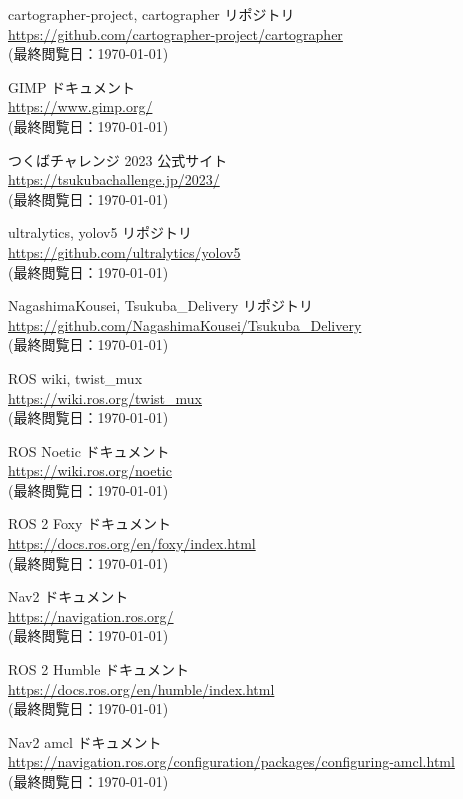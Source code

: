 \documentclass[twocolumn, 9pt]{jsproceedings}
\begin{document}
\begin{thebibliography}{99}
cartographer-project, cartographer リポジトリ\\
\url{https://github.com/cartographer-project/cartographer}\\
(最終閲覧日：\today)

GIMP ドキュメント\\
\url{https://www.gimp.org/}\\
(最終閲覧日：\today)

つくばチャレンジ 2023 公式サイト\\
\url{https://tsukubachallenge.jp/2023/}\\
(最終閲覧日：\today)

ultralytics, yolov5 リポジトリ\\
\url{https://github.com/ultralytics/yolov5}\\
(最終閲覧日：\today)

NagashimaKousei, Tsukuba\_Delivery リポジトリ\\
\url{https://github.com/NagashimaKousei/Tsukuba_Delivery}\\
(最終閲覧日：\today)

ROS wiki, twist\_mux\\
\url{https://wiki.ros.org/twist_mux}\\
(最終閲覧日：\today)

ROS Noetic ドキュメント\\
\url{https://wiki.ros.org/noetic}\\
(最終閲覧日：\today)

ROS 2 Foxy ドキュメント\\
\url{https://docs.ros.org/en/foxy/index.html}\\
(最終閲覧日：\today)

Nav2 ドキュメント\\
\url{https://navigation.ros.org/}\\
(最終閲覧日：\today)

ROS 2 Humble ドキュメント\\
\url{https://docs.ros.org/en/humble/index.html}\\
(最終閲覧日：\today)

Nav2 amcl ドキュメント\\
\url{https://navigation.ros.org/configuration/packages/configuring-amcl.html}\\
(最終閲覧日：\today)


\end{thebibliography}
\end{document}
